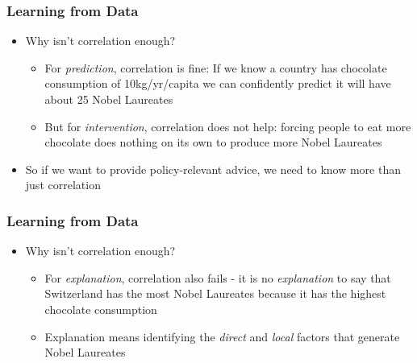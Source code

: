 \documentclass[xcolor=x11names,compress]{beamer}\usepackage[]{graphicx}\usepackage[]{color}
\renewcommand{\(}{\begin{columns}}
\renewcommand{\)}{\end{columns}}
\newcommand{\<}[1]{\begin{column}{#1}}
\renewcommand{\>}{\end{column}}
\begin{document}






\begin{frame}
\frametitle{Learning from Data}
\begin{itemize}
\item Why isn't correlation enough?
\pause
\begin{itemize}
\item For \textit{prediction}, correlation is fine: If we know a country has chocolate consumption of 10kg/yr/capita we can confidently predict it will have about 25 Nobel Laureates
\pause
\item But for \textit{intervention}, correlation does not help: forcing people to eat more chocolate does nothing on its own to produce more Nobel Laureates
\pause
\end{itemize}
\item So if we want to provide policy-relevant advice, we need to know more than just correlation
\end{itemize}
\end{frame}

\begin{frame}
\frametitle{Learning from Data}
\begin{itemize}
\item Why isn't correlation enough?
\begin{itemize}
\item For \textit{explanation}, correlation also fails - it is no \textit{explanation} to say that Switzerland has the most Nobel Laureates because it has the highest chocolate consumption
\item Explanation means identifying the \textit{direct} and \textit{local} factors that generate Nobel Laureates
\end{itemize}
\end{itemize}
\end{frame}
\end{document}

